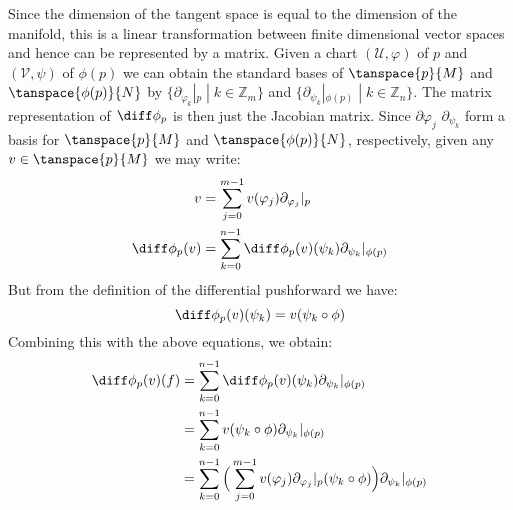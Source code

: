 \documentclass{book}                                                            %
\begin{document}
                Since the dimension of the tangent space is equal to the
                dimension of the manifold, this is a linear transformation
                between finite dimensional vector spaces and hence can be
                represented by a matrix. Given a chart
                $(\mathcal{U},\varphi)$ of $p$ and $(\mathcal{V},\psi)$ of
                $\phi(p)$ we can obtain the standard bases of $\tanspace{p}{M}$
                and $\tanspace{\phi(p)}{N}$ by
                $\{\partial_{\varphi_{k}}|_{p}\;|\;k\in\mathbb{Z}_{m}\}$ and
                $\{\partial_{\psi_{k}}|_{\phi(p)}\;|\;k\in\mathbb{Z}_{n}\}$. The
                matrix representation of $\diff\phi_{p}$ is then just the
                Jacobian matrix. Since
                $\partial\varphi_{j}$ $\partial_{\psi_{k}}$ form a basis
                for $\tanspace{p}{M}$ and $\tanspace{\phi(p)}{N}$, respectively,
                given any $v\in\tanspace{p}{M}$ we may write:
                \begin{subequations}
                    \begin{align}
                        v&=\sum_{j=0}^{m-1}v(\varphi_{j})
                            \partial_{\varphi_{j}}|_{p}\\
                        \diff\phi_{p}(v)&=\sum_{k=0}^{n-1}
                            \diff\phi_{p}(v)(\psi_{k})
                            \partial_{\psi_{k}}|_{\phi(p)}
                    \end{align}
                \end{subequations}
                But from the definition of the differential pushforward we have:
                \begin{equation}
                    \diff\phi_{p}(v)(\psi_{k})=v(\psi_{k}\circ\phi)
                \end{equation}
                Combining this with the above equations, we obtain:
                \begin{subequations}
                    \begin{align}
                        \diff\phi_{p}(v)(f)&=\sum_{k=0}^{n-1}
                            \diff\phi_{p}(v)(\psi_{k})
                            \partial_{\psi_{k}}|_{\phi(p)}\\
                        &=\sum_{k=0}^{n-1}v(\psi_{k}\circ\phi)
                            \partial_{\psi_{k}}|_{\phi(p)}\\
                        &=\sum_{k=0}^{n-1}\Big(
                            \sum_{j=0}^{m-1}v(\varphi_{j})
                            \partial_{\varphi_{j}}|_{p}(\psi_{k}\circ\phi)
                        \Big)\partial_{\psi_{k}}|_{\phi(p)}
                    \end{align}
                \end{subequations}
\end{document}
